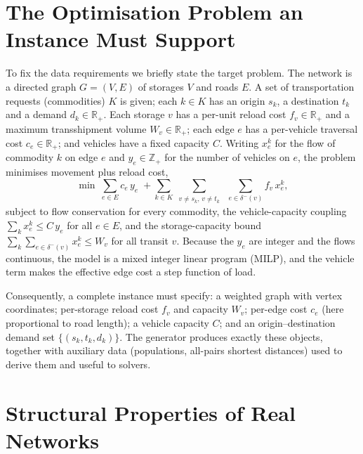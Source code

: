\documentclass[runningheads]{llncs}
\newcommand{\Vv}{V}
\newcommand{\E}{E}
\newcommand{\Real}{\mathbb{R}}
\begin{document}
\section{The Optimisation Problem an Instance Must Support}
\label{sec:problem}

To fix the data requirements we briefly state the target problem. The network is
a directed graph $G=(\Vv,\E)$ of storages $\Vv$ and roads $\E$. A set of
transportation requests (commodities) $K$ is given; each $k\in K$ has an origin
$s_k$, a destination $t_k$ and a demand $d_k\in\Real_+$. Each storage $v$ has a
per-unit reload cost $f_v\in\Real_+$ and a maximum transshipment volume
$W_v\in\Real_+$; each edge $e$ has a per-vehicle traversal cost $c_e\in\Real_+$;
and vehicles have a fixed capacity $C$. Writing $x^k_e$ for the flow of commodity
$k$ on edge $e$ and $y_e\in\mathbb{Z}_+$ for the number of vehicles on $e$, the
problem minimises movement plus reload cost,
\begin{equation}
\min\ \sum_{e\in \E} c_e\,y_e
 \;+\!\!\sum_{k\in K}\sum_{\substack{v\neq s_k,\,v\neq t_k}}\;
 \sum_{e\in\delta^-(v)} f_v\,x^k_e,
\label{eq:obj}
\end{equation}
subject to flow conservation for every commodity, the vehicle-capacity coupling
$\sum_{k} x^k_e\le C\,y_e$ for all $e\in\E$, and the storage-capacity bound
$\sum_{k}\sum_{e\in\delta^-(v)} x^k_e\le W_v$ for all transit $v$. Because the
$y_e$ are integer and the flows continuous, the model is a mixed integer linear
program (MILP), and the vehicle term makes the effective edge cost a step
function of load.

Consequently, a complete instance must specify: a weighted graph with vertex
coordinates; per-storage reload cost $f_v$ and capacity $W_v$; per-edge cost
$c_e$ (here proportional to road length); a vehicle capacity $C$; and an
origin--destination demand set $\{(s_k,t_k,d_k)\}$. The generator produces
exactly these objects, together with auxiliary data (populations, all-pairs
shortest distances) used to derive them and useful to solvers.

\section{Structural Properties of Real Networks}
\label{sec:real}
\end{document}
